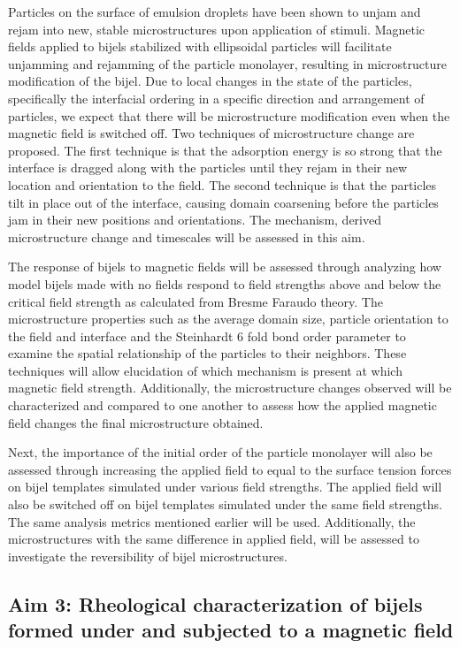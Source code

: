Particles on the surface of emulsion droplets have been shown to unjam and rejam into new, stable microstructures upon application of 
stimuli. \cite{cui_stabilizing_2013} Magnetic fields applied to bijels stabilized with ellipsoidal particles will facilitate unjamming and rejamming of
the particle monolayer, resulting in microstructure modification of the bijel. Due to local changes in the state of the particles, specifically the 
interfacial ordering in a specific direction and arrangement of particles, we expect that there will be microstructure modification even when the 
magnetic field is switched off. Two techniques of microstructure change are proposed. The first technique is that the adsorption 
energy is so strong that the interface is dragged along with the particles until they rejam in their new location and orientation to the 
field. The second technique is that the particles tilt in place out of the interface, causing domain coarsening before the particles jam 
in their new positions and orientations. The mechanism, derived microstructure change and timescales will be assessed in this aim.

The response of bijels to magnetic fields will be assessed through analyzing how model bijels made with no fields respond to field strengths 
above and below the critical field strength as calculated from Bresme Faraudo theory. The microstructure properties such as the average domain 
size, particle orientation to the field and interface and the Steinhardt 6 fold bond order parameter to examine the spatial relationship of 
the particles to their neighbors. These techniques will allow elucidation of which mechanism is present at which magnetic field strength. 
Additionally, the microstructure changes observed will be characterized and compared to one another to assess how the applied magnetic field 
changes the final microstructure obtained. 

Next, the importance of the initial order of the particle monolayer will also be assessed through increasing the applied field to equal to the 
surface tension forces on bijel templates simulated under various field strengths. The applied field will also be switched off on bijel templates 
simulated under the same field strengths. The same analysis metrics mentioned earlier will be used. Additionally, the microstructures with the 
same difference in applied field,  will be assessed to investigate the reversibility of bijel microstructures. 

\subsection{Aim 3: Rheological characterization of bijels formed under and subjected to a magnetic field}
\label{section:aim3_desc}

